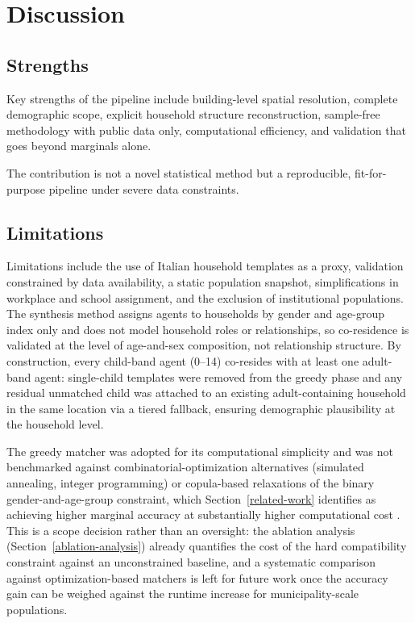 \documentclass{article}
\begin{document}
\section{Discussion}\label{discussion}

\subsection{Strengths}\label{strengths}

Key strengths of the pipeline include building-level spatial resolution, complete demographic scope, explicit household structure reconstruction, sample-free methodology with public data only, computational efficiency, and validation that goes beyond marginals alone.

The contribution is not a novel statistical method but a reproducible, fit-for-purpose pipeline under severe data constraints.

\subsection{Limitations}\label{limitations}

Limitations include the use of Italian household templates as a proxy, validation constrained by data availability, a static population snapshot, simplifications in workplace and school assignment, and the exclusion of institutional populations. The synthesis method assigns agents to households by gender and age-group index only and does not model household roles or relationships, so co-residence is validated at the level of age-and-sex composition, not relationship structure. By construction, every child-band agent (0--14) co-resides with at least one adult-band agent: single-child templates were removed from the greedy phase and any residual unmatched child was attached to an existing adult-containing household in the same location via a tiered fallback, ensuring demographic plausibility at the household level.

\begin{sloppypar}
The greedy matcher was adopted for its computational simplicity and was not benchmarked against combinatorial-optimization alternatives (simulated annealing, integer programming) or copula-based relaxations of the binary gender-and-age-group constraint, which Section~\ref{related-work} identifies as achieving higher marginal accuracy at substantially higher computational cost \citep{DURANHERAS201878}. This is a scope decision rather than an oversight: the ablation analysis (Section~\ref{ablation-analysis}) already quantifies the cost of the hard compatibility constraint against an unconstrained baseline, and a systematic comparison against optimization-based matchers is left for future work once the accuracy gain can be weighed against the runtime increase for municipality-scale populations.
\end{sloppypar}
\end{document}
